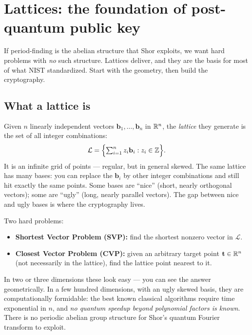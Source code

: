 \section{Lattices: the foundation of post-quantum public key}
\label{ch35:lattices}

If period-finding is the abelian structure that Shor exploits, we want hard problems with \emph{no} such structure. Lattices deliver, and they are the basis for most of what NIST standardized. Start with the geometry, then build the cryptography.

\subsection{What a lattice is}
\label{ch35:lattice-def}

Given $n$ linearly independent vectors $\mathbf{b}_1,\dots,\mathbf{b}_n$ in $\R^n$, the \emph{lattice} they generate is the set of all integer combinations:
\[
  \mathcal{L} = \set[\Big]{\textstyle\sum_{i=1}^n z_i \mathbf{b}_i : z_i \in \Z}.
\]
It is an infinite grid of points --- regular, but in general skewed. The same lattice has many bases: you can replace the $\mathbf{b}_i$ by other integer combinations and still hit exactly the same points. Some bases are ``nice'' (short, nearly orthogonal vectors); some are ``ugly'' (long, nearly parallel vectors). The gap between nice and ugly bases is where the cryptography lives.

Two hard problems:
\begin{itemize}
  \item \textbf{Shortest Vector Problem (SVP):} find the shortest nonzero vector in $\mathcal L$.
  \item \textbf{Closest Vector Problem (CVP):} given an arbitrary target point $\mathbf t \in \R^n$ (not necessarily in the lattice), find the lattice point nearest to it.
\end{itemize}
In two or three dimensions these look easy --- you can see the answer geometrically. In a few hundred dimensions, with an ugly skewed basis, they are computationally formidable: the best known classical algorithms require time exponential in $n$, and \emph{no quantum speedup beyond polynomial factors is known}. There is no periodic abelian group structure for Shor's quantum Fourier transform to exploit.

